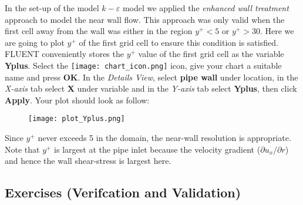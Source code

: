 \documentclass[11pt,a4paper,oneside]{scrartcl}
\newcommand\bfr[1]{\textcolor[rgb]{1,0.00,0.00}{\textbf{\textsf{#1}}}}
\begin{document}
In the set-up of the model $k-\varepsilon$ model we applied the \emph{enhanced wall treatment} approach to model the near wall flow. This approach was only valid when the first cell away from the wall was either in the region $y^+<5$ or $y^+>30$. Here we are going to plot $y^+$ of the first grid cell to ensure this condition is satisfied. FLUENT conveniently stores the $y^+$ value of the first grid cell as the variable \bfr{Yplus}. Select the \texttt{[image: chart\_icon.png]} icon, give your chart a suitable name and press \bfr{OK}. In the \emph{Details View}, select \bfr{pipe wall} under location, in the \emph{X-axis} tab select \bfr{X} under variable and in the \emph{Y-axis} tab select \bfr{Yplus}, then click \bfr{Apply}. Your plot should look as follow:

\begin{figure}[H]
\begin{center}
\texttt{[image: plot\_Yplus.png]}
\end{center}
\end{figure}

Since $y^+$ never exceeds 5 in the domain, the near-wall resolution is appropriate. Note that $y^{+}$ is largest at the pipe inlet because the velocity gradient ($\partial u_{x}/\partial r$) and hence the wall shear-stress is largest here.

\subsection{Exercises (Verifcation and Validation)}
\end{document}
